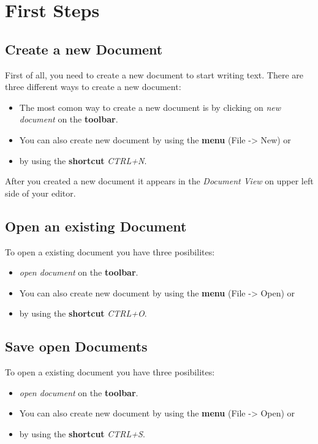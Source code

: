 \documentclass[11pt,a4paper]{article}
\begin{document}
\newpage
\section{First Steps}
\label{first_steps}

\subsection{Create a new Document}
First of all, you need to create a new document to start writing text. There are three different ways to create a new document:
\begin{itemize}
\item The most comon way to create a new document is by clicking on \textit{new document} on the \textbf{toolbar}.
\item You can also create new document by using the \textbf{menu} (File -> New) or
\item by using the \textbf{shortcut} \textit{CTRL+N}.
\end{itemize}

After you created a new document it appears in the \textit{Document View} on upper left side of your editor.

\subsection{Open an existing Document}
To open a existing document you have three posibilites:
\begin{itemize}
\item \textit{open document} on the \textbf{toolbar}.
\item You can also create new document by using the \textbf{menu} (File -> Open) or
\item by using the \textbf{shortcut} \textit{CTRL+O}.
\end{itemize}

\subsection{Save open Documents}

To open a existing document you have three posibilites:
\begin{itemize}
\item \textit{open document} on the \textbf{toolbar}.
\item You can also create new document by using the \textbf{menu} (File -> Open) or
\item by using the \textbf{shortcut} \textit{CTRL+S}.
\end{itemize}
\end{document}
